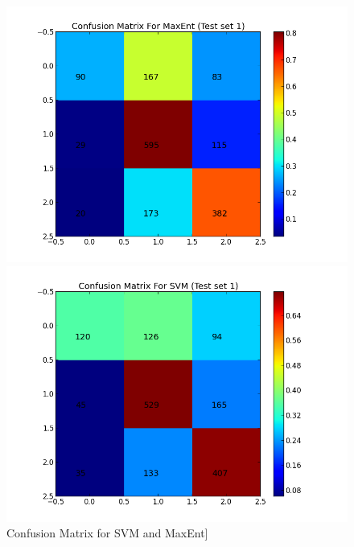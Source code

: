 \begin{figure}[htb]
	\centering
	\begin{minipage}{.45\linewidth}
		\includegraphics[width=\linewidth]{../img/plots/analysis/maxent_confusion_matrix_best.png}
	\end{minipage}
	\hspace{0.05\linewidth}
	\begin{minipage}{.45\linewidth}
		\includegraphics[width=\linewidth]{../img/plots/analysis/svm_confusion_matrix_best.png}
	\end{minipage}
	\label{fig:best_result_confusion}
	\caption[Confusion Matrix for SVM and MaxEnt]{Confusion Matrix for SVM and MaxEnt]}
\end{figure}





